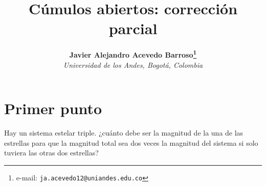 \documentclass[notitlepage,letterpaper,12pt]{article} %
\begin{document}
\title{Cúmulos abiertos: corrección parcial}
\author{
\textbf{Javier Alejandro Acevedo Barroso\thanks{e-mail: \texttt{ja.acevedo12@uniandes.edu.co}}}\\
\textit{Universidad de los Andes, Bogotá, Colombia}\\
} %

\maketitle %






 


\section{Primer punto}
Hay un sistema estelar triple. ¿cuánto debe ser la magnitud de la una de las estrellas para que la magnitud total sea dos veces la magnitud del sistema si solo tuviera las otras dos estrellas?
\end{document}
